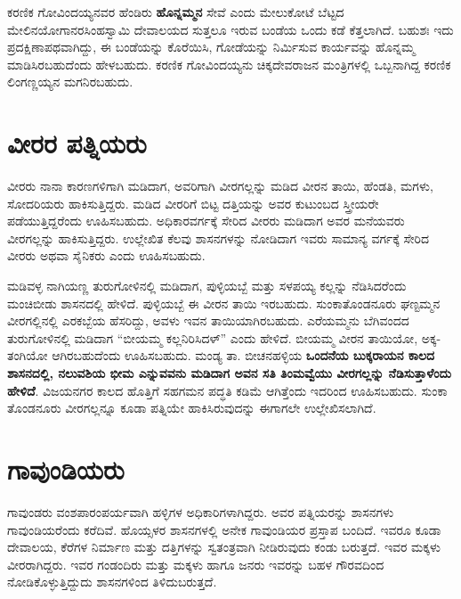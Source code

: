 ಕರಣಿಕ ಗೋವಿಂದಯ್ಯನವರ ಹೆಂಡಿರು \textbf{ಹೊನ್ನಮ್ಮನ} ಸೇವೆ ಎಂದು ಮೇಲುಕೋಟೆ ಬೆಟ್ಟದ ಮೇಲಿನ\break ಯೋಗಾನರಸಿಂಹಸ್ವಾಮಿ ದೇವಾಲಯದ ಸುತ್ತಲೂ ಇರುವ ಬಂಡೆಯ ಒಂದು ಕಡೆ ಕೆತ್ತಲಾಗಿದೆ. ಬಹುಶಃ ಇದು ಪ್ರದಕ್ಷಿಣಾಪಥವಾಗಿದ್ದು, ಈ ಬಂಡೆಯನ್ನು ಕೊರೆಯಿಸಿ, ಗೋಡೆಯನ್ನು ನಿರ್ಮಿಸುವ ಕಾರ್ಯವನ್ನು ಹೊನ್ನಮ್ಮ ಮಾಡಿಸಿರ\-ಬಹುದೆಂದು ಹೇಳಬಹುದು. ಕರಣಿಕ ಗೋವಿಂದಯ್ಯನು ಚಿಕ್ಕದೇವರಾಜನ ಮಂತ್ರಿಗಳಲ್ಲಿ ಒಬ್ಬನಾಗಿದ್ದ ಕರಣಿಕ ಲಿಂಗಣ್ಣಯ್ಯನ ಮಗನಿರಬಹುದು.

\section{ವೀರರ ಪತ್ನಿಯರು}

ವೀರರು ನಾನಾ ಕಾರಣಗಳಿಗಾಗಿ ಮಡಿದಾಗ, ಅವರಿಗಾಗಿ ವೀರಗಲ್ಲನ್ನು ಮಡಿದ ವೀರನ ತಾಯಿ, ಹೆಂಡತಿ, ಮಗಳು, ಸೋದರಿಯರು ಹಾಕಿಸುತ್ತಿದ್ದರು. ಮಡಿದ ವೀರರಿಗೆ ಬಿಟ್ಟ ದತ್ತಿಯನ್ನು ಅವರ ಕುಟುಂಬದ ಸ್ತ್ರೀಯರೇ ಪಡೆಯುತ್ತಿದ್ದರೆಂದು ಊಹಿಸಬಹುದು. ಅಧಿಕಾರವರ್ಗಕ್ಕೆ ಸೇರಿದ ವೀರರು ಮಡಿದಾಗ ಅವರ ಮನೆಯವರು ವೀರಗಲ್ಲನ್ನು ಹಾಕಿಸುತ್ತಿದ್ದರು. ಉಲ್ಲೇಖಿತ ಕೆಲವು ಶಾಸನಗಳನ್ನು ನೋಡಿದಾಗ ಇವರು ಸಾಮಾನ್ಯ ವರ್ಗಕ್ಕೆ ಸೇರಿದ ವೀರರು ಅಥವಾ ಸೈನಿಕರು ಎಂದು ಊಹಿಸಬಹುದು.

ಮಡಿವಳ್ಳ ನಾಗಿಯಣ್ಣ ತುರುಗೋಳಿನಲ್ಲಿ ಮಡಿದಾಗ, ಪುಳ್ಳಿಯಬ್ಬೆ ಮತ್ತು ಸಳಪಯ್ಯ ಕಲ್ಲನ್ನು ನೆಡಿಸಿದರೆಂದು ಮಂಚಿಬೀಡು ಶಾಸನದಲ್ಲಿ ಹೇಳಿದೆ. ಪುಳ್ಳಿಯಬ್ಬೆ ಈ ವೀರನ ತಾಯಿ ಇರಬಹುದು. ಸುಂಕಾತೊಂಡನೂರು ಘಣ್ಟಮ್ಮನ ವೀರಗಲ್ಲಿನಲ್ಲಿ ಎರಕಬ್ಬೆಯ ಹೆಸರಿದ್ದು, ಅವಳು ಇವನ ತಾಯಿಯಾಗಿರಬಹುದು. ಎರೆಯಮ್ಮನು ಬೆಗಿವಂದದ ತುರುಗೋಳಿ\-ನಲ್ಲಿ ಮಡಿದಾಗ “ಬೀಯಮ್ಮ ಕಲ್ಲನಿರಿಸಿದಳ್​” ಎಂದು ಹೇಳಿದೆ. ಬೀಯಮ್ಮ ವೀರನ ತಾಯಿಯೋ, ಅಕ್ಕ-ತಂಗಿಯೋ ಆಗಿರಬಹುದೆಂದು ಊಹಿಸಬಹುದು. ಮಂಡ್ಯ ತಾ. ಬೀಚನಹಳ್ಳಿಯ \textbf{ಒಂದನೆಯ ಬುಕ್ಕರಾಯನ ಕಾಲದ ಶಾಸನದಲ್ಲಿ, ನಲುವಶಿಯ ಭೀಮ ಎನ್ನುವವನು ಮಡಿದಾಗ ಅವನ ಸತಿ ತಿಂಮವ್ವೆಯು ವೀರಗಲ್ಲನ್ನು ನೆಡಿಸುತ್ತಾಳೆಂದು ಹೇಳಿದೆ}. ವಿಜಯನಗರ ಕಾಲದ ಹೊತ್ತಿಗೆ ಸಹಗಮನ ಪದ್ಧತಿ ಕಡಿಮೆ ಆಗಿತ್ತೆಂದು ಇದರಿಂದ ಊಹಿಸಬಹುದು. ಸುಂಕಾ ತೊಂಡನೂರು ವೀರಗಲ್ಲನ್ನೂ ಕೂಡಾ ಪತ್ನಿಯೇ ಹಾಕಿಸಿರುವುದನ್ನು ಈಗಾಗಲೇ ಉಲ್ಲೇಖಿಸಲಾಗಿದೆ.


\section{ಗಾವುಂಡಿಯರು}

ಗಾವುಂಡರು ವಂಶಪಾರಂಪರ್ಯವಾಗಿ ಹಳ್ಳಿಗಳ ಅಧಿಕಾರಿಗಳಾಗಿದ್ದರು. ಅವರ ಪತ್ನಿಯರನ್ನು ಶಾಸನಗಳು ಗಾವುಂಡಿಯರೆಂದು ಕರೆದಿವೆ. ಹೊಯ್ಸಳರ ಶಾಸನಗಳಲ್ಲಿ ಅನೇಕ ಗಾವುಂಡಿಯರ ಪ್ರಸ್ತಾಪ ಬಂದಿದೆ. ಇವರೂ ಕೂಡಾ ದೇವಾಲಯ, ಕೆರೆಗಳ ನಿರ್ಮಾಣ ಮತ್ತು ದತ್ತಿಗಳನ್ನು ಸ್ವತಂತ್ರವಾಗಿ ನೀಡಿರುವುದು ಕಂಡು ಬರುತ್ತದೆ. ಇವರ ಮಕ್ಕಳು ವೀರರಾಗಿದ್ದರು. ಇವರ ಗಂಡಂದಿರು ಮತ್ತು ಮಕ್ಕಳು ಹಾಗೂ ಜನರು ಇವರನ್ನು ಬಹಳ ಗೌರವದಿಂದ ನೋಡಿಕೊಳ್ಳುತ್ತಿದ್ದುದು ಶಾಸನಗಳಿಂದ ತಿಳಿದುಬರುತ್ತದೆ.

